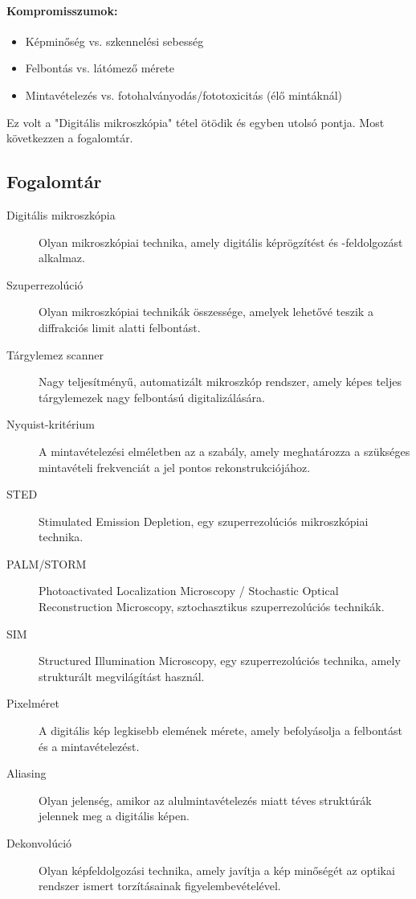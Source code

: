 \documentclass[a4paper,12pt]{article}
\begin{document}
\paragraph{Kompromisszumok:} \begin{itemize} \item Képminőség vs. szkennelési sebesség \item Felbontás vs. látómező mérete \item Mintavételezés vs. fotohalványodás/fototoxicitás (élő mintáknál) \end{itemize}

Ez volt a "Digitális mikroszkópia" tétel ötödik és egyben utolsó pontja. Most következzen a fogalomtár.

\subsection{Fogalomtár} 

\begin{description} \item[Digitális mikroszkópia] Olyan mikroszkópiai technika, amely digitális képrögzítést és -feldolgozást alkalmaz.

\item[Szuperrezolúció] Olyan mikroszkópiai technikák összessége, amelyek lehetővé teszik a diffrakciós limit alatti felbontást. \item[Tárgylemez scanner] Nagy teljesítményű, automatizált mikroszkóp rendszer, amely képes teljes tárgylemezek nagy felbontású digitalizálására. \item[Nyquist-kritérium] A mintavételezési elméletben az a szabály, amely meghatározza a szükséges mintavételi frekvenciát a jel pontos rekonstrukciójához. \item[STED] Stimulated Emission Depletion, egy szuperrezolúciós mikroszkópiai technika. \item[PALM/STORM] Photoactivated Localization Microscopy / Stochastic Optical Reconstruction Microscopy, sztochasztikus szuperrezolúciós technikák. \item[SIM] Structured Illumination Microscopy, egy szuperrezolúciós technika, amely strukturált megvilágítást használ. \item[Pixelméret] A digitális kép legkisebb elemének mérete, amely befolyásolja a felbontást és a mintavételezést. \item[Aliasing] Olyan jelenség, amikor az alulmintavételezés miatt téves struktúrák jelennek meg a digitális képen. \item[Dekonvolúció] Olyan képfeldolgozási technika, amely javítja a kép minőségét az optikai rendszer ismert torzításainak figyelembevételével.
\end{description}
\end{document}
